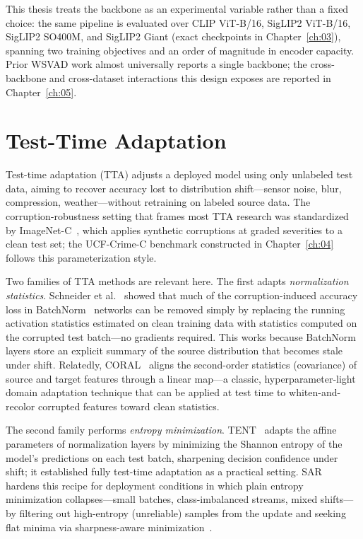 This thesis treats the backbone as an experimental variable rather than a fixed choice: the same
pipeline is evaluated over CLIP ViT-B/16, SigLIP2 ViT-B/16, SigLIP2 SO400M, and SigLIP2 Giant
(exact checkpoints in Chapter~\ref{ch:03}), spanning two training objectives and an order of
magnitude in encoder capacity. Prior WSVAD work almost universally reports a single backbone;
the cross-backbone and cross-dataset interactions this design exposes are reported in
Chapter~\ref{ch:05}.

\section{Test-Time Adaptation}
\label{sec:rw-tta}

Test-time adaptation (TTA) adjusts a deployed model using only unlabeled test data, aiming to
recover accuracy lost to distribution shift---sensor noise, blur, compression, weather---without
retraining on labeled source data. The corruption-robustness setting that frames most TTA
research was standardized by ImageNet-C~\cite{hendrycks2019imagenetc}, which applies synthetic
corruptions at graded severities to a clean test set; the UCF-Crime-C benchmark constructed in
Chapter~\ref{ch:04} follows this parameterization style.

Two families of TTA methods are relevant here. The first adapts \emph{normalization statistics}.
Schneider et al.~\cite{schneider2020norm} showed that much of the corruption-induced accuracy
loss in BatchNorm~\cite{ioffe2015batchnorm} networks can be removed simply by replacing the
running activation statistics estimated on clean training data with statistics computed on the
corrupted test batch---no gradients required. This works because BatchNorm layers store an
explicit summary of the source distribution that becomes stale under shift. Relatedly,
CORAL~\cite{sun2016coral} aligns the second-order statistics (covariance) of source and target
features through a linear map---a classic, hyperparameter-light domain adaptation technique that
can be applied at test time to whiten-and-recolor corrupted features toward clean statistics.

The second family performs \emph{entropy minimization}. TENT~\cite{wang2021tent} adapts the
affine parameters of normalization layers by minimizing the Shannon entropy of the model's
predictions on each test batch, sharpening decision confidence under shift; it established
fully test-time adaptation as a practical setting. SAR~\cite{niu2023sar} hardens this recipe for
deployment conditions in which plain entropy minimization collapses---small batches, class-imbalanced
streams, mixed shifts---by filtering out high-entropy (unreliable) samples from the update and
seeking flat minima via sharpness-aware minimization~\cite{foret2021sam}.

